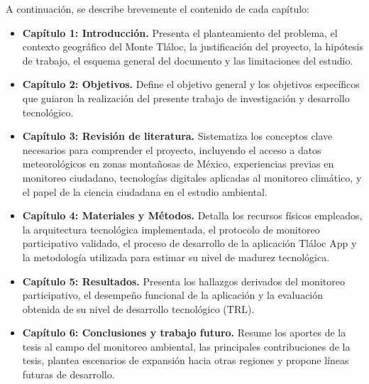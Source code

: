A continuación, se describe brevemente el contenido de cada capítulo:

\begin{itemize}
    \item \textbf{Capítulo 1: Introducción.} Presenta el planteamiento del problema, el contexto geográfico del Monte Tláloc, la justificación del proyecto, la hipótesis de trabajo, el esquema general del documento y las limitaciones del estudio.
    
    \item \textbf{Capítulo 2: Objetivos.} Define el objetivo general y los objetivos específicos que guiaron la realización del presente trabajo de investigación y desarrollo tecnológico.
    
    \item \textbf{Capítulo 3: Revisión de literatura.} Sistematiza los conceptos clave necesarios para comprender el proyecto, incluyendo el acceso a datos meteorológicos en zonas montañosas de México, experiencias previas en monitoreo ciudadano, tecnologías digitales aplicadas al monitoreo climático, y el papel de la ciencia ciudadana en el estudio ambiental.
    
    \item \textbf{Capítulo 4: Materiales y Métodos.} Detalla los recursos físicos empleados, la arquitectura tecnológica implementada, el protocolo de monitoreo participativo validado, el proceso de desarrollo de la aplicación Tláloc App y la metodología utilizada para estimar su nivel de madurez tecnológica.
    
    \item \textbf{Capítulo 5: Resultados.} Presenta los hallazgos derivados del monitoreo participativo, el desempeño funcional de la aplicación y la evaluación obtenida de su nivel de desarrollo tecnológico (TRL).
    
    \item \textbf{Capítulo 6: Conclusiones y trabajo futuro.} Resume los aportes de la tesis al campo del monitoreo ambiental, las principales contribuciones de la tesis, plantea escenarios de expansión hacia otras regiones y propone líneas futuras de desarrollo.
\end{itemize}


